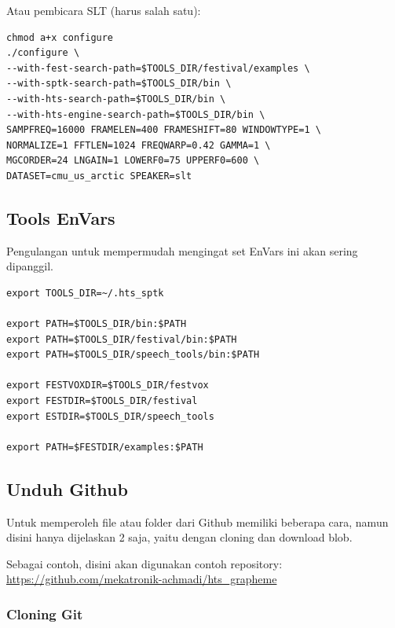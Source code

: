 \documentclass[12pt,]{article}
\begin{document}
\begin{enumerate}
		Atau pembicara SLT (harus salah satu):
		\begin{verbatim}
chmod a+x configure
./configure \
--with-fest-search-path=$TOOLS_DIR/festival/examples \
--with-sptk-search-path=$TOOLS_DIR/bin \
--with-hts-search-path=$TOOLS_DIR/bin \
--with-hts-engine-search-path=$TOOLS_DIR/bin \
SAMPFREQ=16000 FRAMELEN=400 FRAMESHIFT=80 WINDOWTYPE=1 \
NORMALIZE=1 FFTLEN=1024 FREQWARP=0.42 GAMMA=1 \
MGCORDER=24 LNGAIN=1 LOWERF0=75 UPPERF0=600 \
DATASET=cmu_us_arctic SPEAKER=slt
		\end{verbatim}
		
	\end{enumerate}
	
	\newpage
	\subsection{Tools EnVars}
	
	Pengulangan untuk mempermudah mengingat set EnVars ini akan sering dipanggil.
	
	\begin{verbatim}
export TOOLS_DIR=~/.hts_sptk

export PATH=$TOOLS_DIR/bin:$PATH
export PATH=$TOOLS_DIR/festival/bin:$PATH
export PATH=$TOOLS_DIR/speech_tools/bin:$PATH

export FESTVOXDIR=$TOOLS_DIR/festvox
export FESTDIR=$TOOLS_DIR/festival
export ESTDIR=$TOOLS_DIR/speech_tools

export PATH=$FESTDIR/examples:$PATH
	\end{verbatim}
	
	\subsection{Unduh Github}
	
	Untuk memperoleh file atau folder dari Github memiliki beberapa cara,
	namun disini hanya dijelaskan 2 saja, 
	yaitu dengan cloning dan download blob.
	
	Sebagai contoh, disini akan digunakan contoh repository:\\
	\url{https://github.com/mekatronik-achmadi/hts_grapheme}
	
	\subsubsection{Cloning Git}
	
\end{document}
